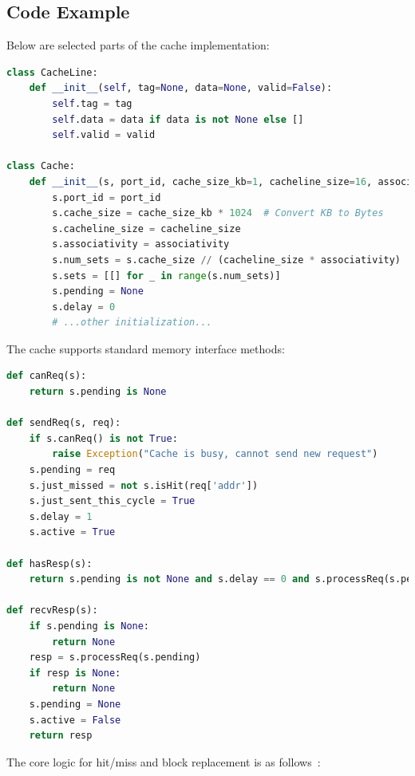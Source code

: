 \documentclass[12pt,a4paper]{report}
\begin{document}
\subsection{Code Example}
Below are selected parts of the cache implementation:

\begin{lstlisting}[language=Python]
class CacheLine:
    def __init__(self, tag=None, data=None, valid=False):
        self.tag = tag
        self.data = data if data is not None else []
        self.valid = valid

class Cache:
    def __init__(s, port_id, cache_size_kb=1, cacheline_size=16, associativity=1):
        s.port_id = port_id
        s.cache_size = cache_size_kb * 1024  # Convert KB to Bytes
        s.cacheline_size = cacheline_size
        s.associativity = associativity
        s.num_sets = s.cache_size // (cacheline_size * associativity)
        s.sets = [[] for _ in range(s.num_sets)]
        s.pending = None
        s.delay = 0
        # ...other initialization...
\end{lstlisting}

The cache supports standard memory interface methods:

\begin{lstlisting}[language=Python]
def canReq(s):
    return s.pending is None

def sendReq(s, req):
    if s.canReq() is not True:
        raise Exception("Cache is busy, cannot send new request")
    s.pending = req
    s.just_missed = not s.isHit(req['addr'])
    s.just_sent_this_cycle = True
    s.delay = 1
    s.active = True

def hasResp(s):
    return s.pending is not None and s.delay == 0 and s.processReq(s.pending) is not None

def recvResp(s):
    if s.pending is None:
        return None
    resp = s.processReq(s.pending)
    if resp is None:
        return None
    s.pending = None
    s.active = False
    return resp
\end{lstlisting}

The core logic for hit/miss and block replacement is as follows~\cite{gfg_lru_cache,sciencedirect_set_associative}:
\end{document}
